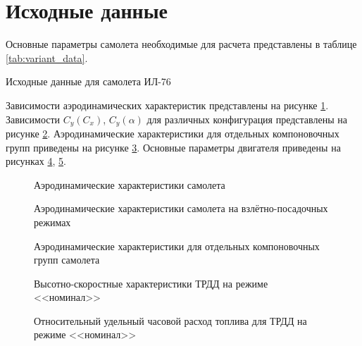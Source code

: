 \section{Исходные данные}

Основные параметры самолета необходимые для расчета представлены в таблице
\ref{tab:variant_data}.

\begin{table}[H]
    \centering
    \caption{Исходные данные для самолета ИЛ-76}
    \label{tab:variant_data}
    \resizebox{\textwidth}{!}{
        
    }
\end{table}

Зависимости аэродинамических характеристик представлены на рисунке
\ref{fig:aero_data}. Зависимости $C_y(C_x)$, $C_y(\alpha)$ для различных 
конфигурация представлены на рисунке \ref{fig:aero_data_landing}.
Аэродинамические характеристики для отдельных компоновочных групп приведены на
рисунке \ref{fig:aero_data_elements}.
Основные параметры двигателя приведены на рисунках \ref{fig:tilda_P_data},
\ref{fig:tilda_Ce_data}.

\begin{figure}[H]
\centering
\resizebox{.79\linewidth}{!}{}
\caption{Аэродинамические характеристики самолета}
\label{fig:aero_data}
\end{figure}
\begin{figure}[H]
\centering
\resizebox{.79\linewidth}{!}{}
\caption{Аэродинамические характеристики самолета на взлётно-посадочных режимах}
\label{fig:aero_data_landing}
\end{figure}
\begin{figure}[H]
\centering
\resizebox{.79\linewidth}{!}{}
\caption{Аэродинамические характеристики для отдельных компоновочных групп самолета}
\label{fig:aero_data_elements}
\end{figure}
\begin{figure}[H]
\centering
\resizebox{.79\linewidth}{!}{}
\caption{Высотно-скоростные характеристики ТРДД на режиме <<номинал>>}
\label{fig:tilda_P_data}
\end{figure}
\begin{figure}[H]
\centering
\resizebox{.79\linewidth}{!}{}
\caption{Относительный удельный часовой расход топлива для ТРДД на режиме <<номинал>>}
\label{fig:tilda_Ce_data}
\end{figure}
